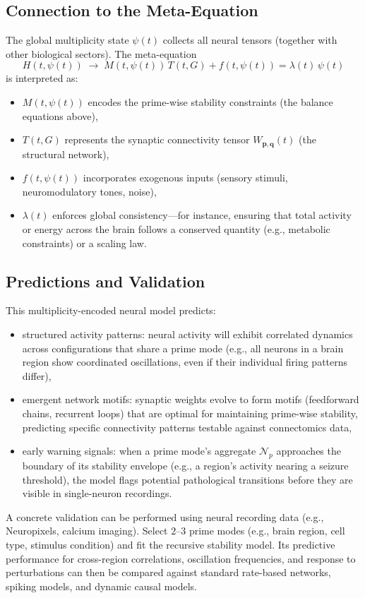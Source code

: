 \documentclass[11pt]{article}
\begin{document}
\subsection{Connection to the Meta-Equation}
The global multiplicity state $\psi(t)$ collects all neural tensors (together with other biological sectors). The meta-equation
\[
H(t,\psi(t))
\;\to\;
M(t,\psi(t))\,T(t,G)
+
f(t,\psi(t))
=
\lambda(t)\,\psi(t)
\]
is interpreted as:
\begin{itemize}
    \item $M(t,\psi(t))$ encodes the prime-wise stability constraints (the balance equations above),
    \item $T(t,G)$ represents the synaptic connectivity tensor $W_{\mathbf{p},\mathbf{q}}(t)$ (the structural network),
    \item $f(t,\psi(t))$ incorporates exogenous inputs (sensory stimuli, neuromodulatory tones, noise),
    \item $\lambda(t)$ enforces global consistency---for instance, ensuring that total activity or energy across the brain follows a conserved quantity (e.g., metabolic constraints) or a scaling law.
\end{itemize}

\subsection{Predictions and Validation}
This multiplicity-encoded neural model predicts:
\begin{itemize}
    \item structured activity patterns: neural activity will exhibit correlated dynamics across configurations that share a prime mode (e.g., all neurons in a brain region show coordinated oscillations, even if their individual firing patterns differ),
    \item emergent network motifs: synaptic weights evolve to form motifs (feedforward chains, recurrent loops) that are optimal for maintaining prime-wise stability, predicting specific connectivity patterns testable against connectomics data,
    \item early warning signals: when a prime mode's aggregate $\mathcal{N}_p$ approaches the boundary of its stability envelope (e.g., a region's activity nearing a seizure threshold), the model flags potential pathological transitions before they are visible in single-neuron recordings.
\end{itemize}

A concrete validation can be performed using neural recording data (e.g., Neuropixels, calcium imaging). Select $2$--$3$ prime modes (e.g., brain region, cell type, stimulus condition) and fit the recursive stability model. Its predictive performance for cross-region correlations, oscillation frequencies, and response to perturbations can then be compared against standard rate-based networks, spiking models, and dynamic causal models.
\end{document}
